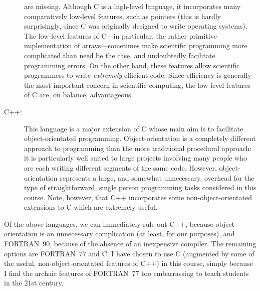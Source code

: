 \begin{description}
are missing. Although C is a high-level language, it incorporates many comparatively low-level
features, such as pointers (this is hardly surprisingly,
since C was originally designed to write operating systems). The low-level features of C---in particular,
the rather primitive implementation of arrays---sometimes make scientific programming more complicated than need be the
case, and undoubtedly facilitate programming errors. On the other hand, these features allow
scientific programmers to write {\em extremely}\/ efficient code. Since efficiency is generally the most
important concern in scientific computing, the low-level features of C are, on balance,
 advantageous.
\item [{\sc C++}:] This language is a major extension of C whose main aim is to
facilitate object-orientated
programming. Object-orientation  is a completely different approach to
programming than the
more traditional procedural approach: it is particularly well suited to large  projects involving
many people who are each writing different segments of the same code. However, object-orientation
represents a large, and somewhat unnecessary, overhead for the type of straightforward, single person 
programming tasks considered in this course.
Note, however, that C++  incorporates some non-object-orientated extensions to C which are extremely
 useful.
\end{description}
Of the above languages, we can immediately rule out C++,
because object-orientation is an unnecessary complication (at least, for our purposes), and FORTRAN~90, because of the absence of an inexpensive
compiler. The remaining options are FORTRAN~77 and C.
I have chosen to use C (augmented by some of the useful, non-object-orientated
features of C++) in this course, simply because I find the archaic features of
FORTRAN~77 too embarrassing to teach students in the 21st century. 
